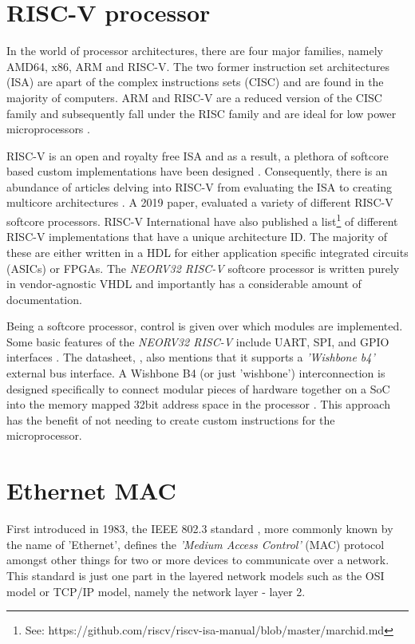 \section{RISC-V processor}
In the world of processor architectures, there are four major families, namely AMD64, x86, ARM and RISC-V. The two former instruction set architectures (ISA) 
are apart of the complex instructions sets (CISC) and are found in the majority of computers. ARM and RISC-V are a reduced version of the CISC family and 
subsequently fall under the RISC family and are ideal for low power microprocessors \cite{RV16Embedded}.

RISC-V is an open and royalty free ISA and as a result, a plethora of softcore based custom implementations have been designed \cite{CatalogRISCSoftcore}. 
Consequently, there is an abundance of articles delving into RISC-V from evaluating the ISA \cite{InvestigatingRiscv} to creating multicore architectures
\cite{RiscVMulticore}. A 2019 paper, \cite{CatalogRISCSoftcore} evaluated a variety of different RISC-V softcore processors. RISC-V International have 
also published a list\footnote[1]{See: https://github.com/riscv/riscv-isa-manual/blob/master/marchid.md} of different RISC-V implementations 
that have a unique architecture ID. The majority of these are either written in a HDL for either application specific integrated circuits (ASICs) or FPGAs.
The \textit{NEORV32 RISC-V} softcore processor is written purely in vendor-agnostic VHDL and importantly has a considerable amount of documentation. 

Being a softcore processor, control is given over which modules are implemented. Some basic features of the \textit{NEORV32 RISC-V} include 
UART, SPI, and GPIO interfaces \cite{neorv32Datasheet}. The datasheet, \cite{neorv32Datasheet}, also mentions that it supports a \textit{'Wishbone b4'} 
external bus interface. A Wishbone B4 (or just 'wishbone') interconnection is designed specifically to connect modular pieces of hardware together on a 
SoC into the memory mapped 32bit address space in the processor \cite{WishboneSpec}. This approach has the benefit of not needing to create custom 
instructions for the microprocessor. 


\section{Ethernet MAC}

First introduced in 1983, the IEEE 802.3 standard \cite{IEEE802.3-2012}, more commonly known by the name of 'Ethernet', defines the \textit{'Medium Access Control'} 
(MAC) protocol amongst other things for two or more devices to communicate over a network. This standard is just one part in the layered network 
models such as the OSI model or TCP/IP model, namely the network layer - layer 2. 


